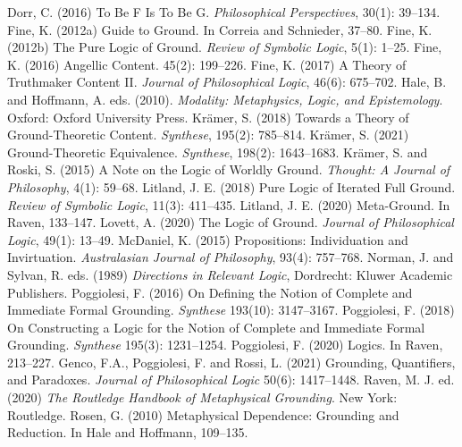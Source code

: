 \documentclass[twoside,14Q,dvipdfmx]{jsarticle}
\theoremstyle{definition}
\begin{document}
\begin{thebibliography}{99}
 Dorr, C. (2016) To Be F Is To Be G. \emph{Philosophical Perspectives}, 30(1): 39--134.
 Fine, K. (2012a) Guide to Ground. In Correia and Schnieder\cite{CorreiaSchnieder2012}, 37--80.
 Fine, K. (2012b) The Pure Logic of Ground. \emph{Review of Symbolic Logic}, 5(1): 1--25.
 Fine, K. (2016) Angellic Content. 45(2): 199--226.
 Fine, K. (2017) A Theory of Truthmaker Content II. \emph{Journal of Philosophical Logic}, 46(6): 675--702.
 Hale, B. and Hoffmann, A. eds. (2010). \emph{Modality: Metaphysics, Logic, and Epistemology}. Oxford: Oxford University Press.
 Kr\"{a}mer, S. (2018) Towards a Theory of Ground-Theoretic Content. \emph{Synthese}, 195(2): 785--814.
 Kr\"{a}mer, S. (2021) Ground-Theoretic Equivalence. \emph{Synthese}, 198(2): 1643--1683.
 Kr\"{a}mer, S. and Roski, S. (2015) A Note on the Logic of Worldly Ground. \emph{Thought: A Journal of Philosophy}, 4(1): 59--68.
 Litland, J. E. (2018) Pure Logic of Iterated Full Ground. \emph{Review of Symbolic Logic}, 11(3): 411--435.
 Litland, J. E. (2020) Meta-Ground. In Raven\cite{Raven2020}, 133--147.
 Lovett, A. (2020) The Logic of Ground. \emph{Journal of Philosophical Logic}, 49(1): 13--49.
 McDaniel, K. (2015) Propositions: Individuation and Invirtuation. \emph{Australasian Journal of Philosophy}, 93(4): 757--768.
 Norman, J. and Sylvan, R. eds. (1989) \emph{Directions in Relevant Logic}, Dordrecht: Kluwer Academic Publishers.
 Poggiolesi, F. (2016) On Defining the Notion of Complete and Immediate Formal Grounding. \emph{Synthese} 193(10): 3147--3167.
 Poggiolesi, F. (2018) On Constructing a Logic for the Notion of Complete and Immediate Formal Grounding. \emph{Synthese} 195(3): 1231--1254.
 Poggiolesi, F. (2020) Logics. In Raven\cite{Raven2020}, 213--227.
 Genco, F.A., Poggiolesi, F. and Rossi, L. (2021) Grounding, Quantifiers, and Paradoxes. \emph{Journal of Philosophical Logic} 50(6): 1417--1448.
 Raven, M. J. ed. (2020) \emph{The Routledge Handbook of Metaphysical Grounding}. New York: Routledge.
 Rosen, G. (2010) Metaphysical Dependence: Grounding and Reduction. In Hale and Hoffmann\cite{HaleandHoffmann2010}, 109--135.
\end{thebibliography}
\end{document}
